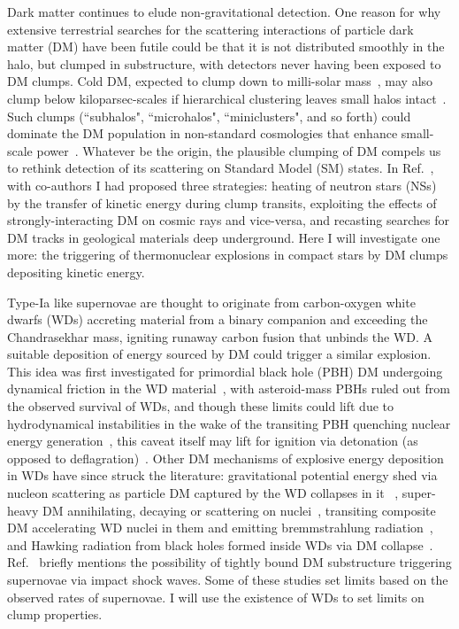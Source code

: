 \documentclass[
    twocolumn,
	prd,
        amssymb,
	preprintnumbers,
	secnumarabic,
	nofootinbib,
	superscriptaddress]{revtex4-1}
\begin{document}
Dark matter continues to elude non-gravitational detection.
One reason for why extensive terrestrial searches for the scattering interactions of particle dark matter (DM) have been futile could be that it is not distributed smoothly in the halo, but clumped in substructure, with detectors never having been exposed to DM clumps.
Cold DM, expected to clump down to milli-solar mass~\cite{Zybin:1999ic,Hofmann:2001bi,Berezinsky:2007qu}, 
may also clump below kiloparsec-scales if hierarchical clustering leaves small halos intact~\cite{BergstromGondolo:1998jj,vandenBosch:2017ynq,vandenBosch:2018tyt}.
Such clumps (``subhalos", ``microhalos", ``miniclusters", and so forth) could dominate the DM population in non-standard cosmologies that enhance small-scale power~\cite{ErickcekSigurdson,Barenboim:2013gya,FanWatson,drorcodecay,inflatflucs,Buckley:2017ttd,nussinovcluster,Barenboim:2021swl,Domenech:2023afs}. 
Whatever be the origin, the plausible clumping of DM compels us to rethink detection of its scattering on Standard Model (SM) states. 
In Ref.~\cite{NSvIR:clumps2021}, with co-authors I had proposed three strategies:
heating of neutron stars (NSs) by the transfer of kinetic energy during clump transits, 
exploiting the effects of strongly-interacting DM on cosmic rays and vice-versa,
and recasting searches for DM tracks in geological materials deep underground.
Here I will investigate one more: the triggering of thermonuclear explosions in compact stars by DM clumps depositing kinetic energy.

Type-Ia like supernovae are thought to originate from carbon-oxygen white dwarfs (WDs) accreting material from a binary companion and exceeding the Chandrasekhar mass, igniting runaway carbon fusion that unbinds the WD.
A suitable deposition of energy sourced by DM could trigger a similar explosion. 
This idea was first investigated for primordial black hole (PBH) DM undergoing dynamical friction in the WD material~\cite{GrahamRajendVarelaPBHWD}, with asteroid-mass PBHs ruled out from the observed survival of WDs, and though these limits could lift due to hydrodynamical instabilities in the wake of the transiting PBH quenching nuclear energy generation~\cite{MonteroCamachoHirata2019}, this caveat itself may lift for ignition via detonation (as opposed to deflagration)~\cite{SteigerwaldDetonationPBH:2021vgi}. 
Other DM mechanisms of explosive energy deposition in WDs have since struck the literature: 
gravitational potential energy shed via nucleon scattering as particle DM captured by the WD collapses in it ~\cite{Leung:2013pra,GrahamRajendVarelaPBHWD,Bramante:2015cua,FedderkeWDCHAMPs:2019jur,SteigerwaldProfumo:2022pjo},
super-heavy DM annihilating, decaying or scattering on nuclei~\cite{Graham:2018efk,MACROSidhu2020},
transiting composite DM accelerating WD nuclei in them and emitting bremmstrahlung radiation~\cite{Acevedo:2020avd}, 
and
Hawking radiation from black holes formed inside WDs via DM collapse~\cite{Acevedo:2019gre,Janish:2019nkk,FedderkeWDCHAMPs:2019jur}.
Ref.~\cite{StellarShocksDas2022} briefly mentions the possibility of tightly bound DM substructure triggering supernovae via impact shock waves. 
Some of these studies set limits based on the observed rates of supernovae.
I will use the existence of WDs to set limits on clump properties.
\end{document}

